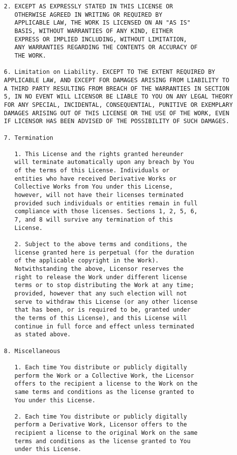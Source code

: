 \begin{Verbatim}[fontsize=\scriptsize]
   2. EXCEPT AS EXPRESSLY STATED IN THIS LICENSE OR
   OTHERWISE AGREED IN WRITING OR REQUIRED BY
   APPLICABLE LAW, THE WORK IS LICENSED ON AN "AS IS"
   BASIS, WITHOUT WARRANTIES OF ANY KIND, EITHER
   EXPRESS OR IMPLIED INCLUDING, WITHOUT LIMITATION,
   ANY WARRANTIES REGARDING THE CONTENTS OR ACCURACY OF
   THE WORK.

6. Limitation on Liability. EXCEPT TO THE EXTENT REQUIRED BY
APPLICABLE LAW, AND EXCEPT FOR DAMAGES ARISING FROM LIABILITY TO
A THIRD PARTY RESULTING FROM BREACH OF THE WARRANTIES IN SECTION
5, IN NO EVENT WILL LICENSOR BE LIABLE TO YOU ON ANY LEGAL THEORY
FOR ANY SPECIAL, INCIDENTAL, CONSEQUENTIAL, PUNITIVE OR EXEMPLARY
DAMAGES ARISING OUT OF THIS LICENSE OR THE USE OF THE WORK, EVEN
IF LICENSOR HAS BEEN ADVISED OF THE POSSIBILITY OF SUCH DAMAGES.

7. Termination

   1. This License and the rights granted hereunder
   will terminate automatically upon any breach by You
   of the terms of this License. Individuals or
   entities who have received Derivative Works or
   Collective Works from You under this License,
   however, will not have their licenses terminated
   provided such individuals or entities remain in full
   compliance with those licenses. Sections 1, 2, 5, 6,
   7, and 8 will survive any termination of this
   License.

   2. Subject to the above terms and conditions, the
   license granted here is perpetual (for the duration
   of the applicable copyright in the Work).
   Notwithstanding the above, Licensor reserves the
   right to release the Work under different license
   terms or to stop distributing the Work at any time;
   provided, however that any such election will not
   serve to withdraw this License (or any other license
   that has been, or is required to be, granted under
   the terms of this License), and this License will
   continue in full force and effect unless terminated
   as stated above.

8. Miscellaneous

   1. Each time You distribute or publicly digitally
   perform the Work or a Collective Work, the Licensor
   offers to the recipient a license to the Work on the
   same terms and conditions as the license granted to
   You under this License.

   2. Each time You distribute or publicly digitally
   perform a Derivative Work, Licensor offers to the
   recipient a license to the original Work on the same
   terms and conditions as the license granted to You
   under this License.


\end{Verbatim}
